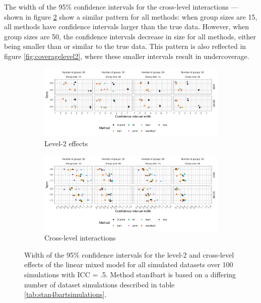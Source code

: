 \documentclass[3p,12pt,a4paper]{elsarticle}
\begin{document}
The width of the 95\% confidence intervals for the cross-level interactions --- shown in figure \ref{fig:ciwcrosslevel} show a similar pattern for all methods: when group sizes are 15, all methods have confidence intervals larger than the true data. However, when group sizes are 50, the confidence intervals decrease in size for all methods, either being smaller than or similar to the true data. This pattern is also reflected in figure \ref{fig:coveragelevel2}, where these smaller intervals result in undercoverage.

\begin{figure}[H]
    \centering 
    \begin{subfigure}[b]{1\textwidth}
        \centering
        \includegraphics[width=1\textwidth]{ciwlevel2.png}
        \caption{Level-2 effects}
        \label{fig:ciwlevel2}
    \end{subfigure}
    \begin{subfigure}[b]{1\textwidth}
        \centering
        \includegraphics[width=1\textwidth]{ciwcrosslevel.png}
        \caption{Cross-level interactions}
        \label{fig:ciwcrosslevel}
    \end{subfigure}
    \caption{Width of the 95\% confidence intervals for the level-2 and cross-level effects of the linear mixed model for all simulated datasets over 100 simulations with ICC = .5. Method stan4bart is based on a differing number of dataset simulations described in table \ref{tab:stan4bartsimulations}.}
    \label{fig:ciwlevel2crosslevel}
\end{figure}
\end{document}
